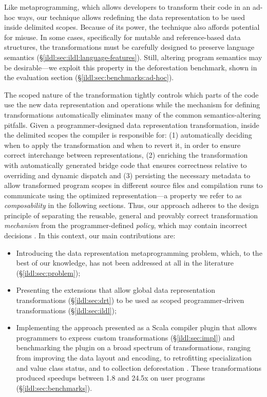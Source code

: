 Like metaprogramming, which allows developers to transform their code in an ad-hoc ways, our technique allows redefining the data representation to be used inside delimited scopes. Because of its power, the technique also affords potential for misuse. In some cases, specifically for mutable and reference-based data structures, the transformations must be carefully designed to preserve language semantics
(\S\ref{ildl:sec:ildl:language-features}). Still, altering program semantics may be desirable---we exploit this property in the deforestation benchmark, shown in the evaluation section (\S\ref{ildl:sec:benchmarks:ad-hoc}).

The scoped nature of the transformation tightly controls which parts of the code use the new data representation and operations while the mechanism for defining transformations automatically eliminates
many of the common semantics-altering pitfalls. Given a programmer-designed data representation transformation, inside the delimited scopes the compiler is responsible for: (1) automatically deciding when to apply the transformation and when to revert it, in order to ensure correct interchange between representations, (2) enriching the transformation with automatically generated bridge code that ensures correctness relative to overriding and dynamic dispatch and (3) persisting the necessary metadata to allow transformed program scopes in different source files and compilation runs to communicate using the optimized representation---a property we refer to as \emph{composability} in the following sections. Thus, our approach adheres to the design principle of separating the reusable, general and provably correct transformation \emph{mechanism} from the programmer-defined \emph{policy}, which may contain incorrect decisions \cite{lampson-mechanism-policy}. In this context, our main contributions are:

\begin{itemize}
  \item Introducing the data representation metaprogramming problem, which, to the best of our knowledge, has not been addressed at all in the literature (\S\ref{ildl:sec:problem});
  \item Presenting the extensions that allow global data representation transformations (\S\ref{ildl:sec:drt}) to be used as scoped programmer-driven transformations (\S\ref{ildl:sec:ildl});
  \item Implementing the approach presented as a Scala compiler plugin \cite{ildl-plugin} that allows programmers to express custom transformations (\S\ref{ildl:sec:impl}) and benchmarking the plugin on a broad spectrum of transformations, ranging from improving the data layout and encoding, to retrofitting specialization and value class status, and to collection deforestation \cite{wadler-deforestation}. These transformations produced  speedups between 1.8 and 24.5x on user programs (\S\ref{ildl:sec:benchmarks}).
\end{itemize}
